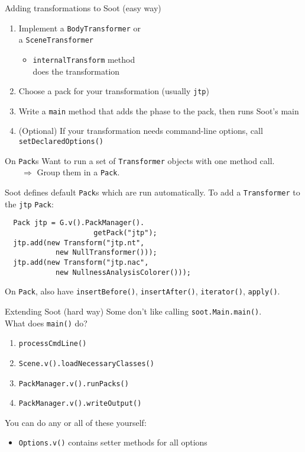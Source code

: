 \begin{slide}{Adding transformations to Soot (easy way)}
\vspace*{-0.1in}
\begin{enumerate}
\item Implement a \texttt{BodyTransformer} or\\ a \texttt{SceneTransformer}
\begin{itemize}
\item \texttt{internalTransform} method \\does the transformation
\end{itemize}
\item Choose a pack for your transformation (usually \texttt{jtp})
\item Write a \texttt{main} method that adds the phase to the pack, then
runs Soot's main
\item (Optional) If your transformation needs command-line options,
call \texttt{setDeclaredOptions()}
\end{enumerate}
\end{slide}

\begin{slide}{On {\tt Pack}s}
\vspace*{-0.2in}
Want to run a set of {\tt Transformer} objects with one method call.\\
$\qquad \Rightarrow$ Group them in a {\tt Pack}.

\vspace{0.1in}
Soot defines default {\tt Pack}s which are run automatically.
To add a {\tt Transformer} to the {\tt jtp} {\tt Pack}:
\begin{verbatim}
  Pack jtp = G.v().PackManager().
                     getPack("jtp");
  jtp.add(new Transform("jtp.nt", 
            new NullTransformer()));
  jtp.add(new Transform("jtp.nac", 
            new NullnessAnalysisColorer()));
\end{verbatim}

On {\tt Pack}, also have {\tt insertBefore()}, {\tt insertAfter()},
{\tt iterator()}, {\tt apply()}.
\end{slide}

\begin{slide}{Extending Soot (hard way)}
Some don't like calling {\texttt{soot.Main.main()}}.\\
What does \texttt{main()} do?
\begin{enumerate}
\item \texttt{processCmdLine()}
\item \texttt{Scene.v().loadNecessaryClasses()}
\item \texttt{PackManager.v().runPacks()}
\item \texttt{PackManager.v().writeOutput()}
\end{enumerate}
You can do any or all of these yourself:
\begin{itemize}
\item \texttt{Options.v()} contains setter methods for all options
\end{itemize}
\end{slide}


